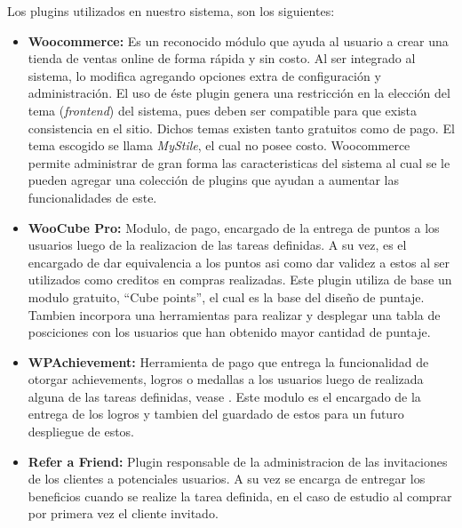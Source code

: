 Los plugins utilizados en nuestro sistema, son los siguientes:

\begin{itemize}

    \item {\bf Woocommerce:}
        Es un reconocido módulo que ayuda al usuario a crear una tienda de
        ventas online de forma rápida y sin costo.
        Al ser integrado al sistema, lo modifica agregando opciones
        extra de configuración y administración.
        El uso de éste plugin genera una restricción en la elección
        del tema (\emph{frontend}) del sistema, pues deben ser compatible
        para que exista consistencia en el sitio.
        Dichos temas existen tanto gratuitos como de pago.
        El tema escogido se llama \emph{MyStile}, el cual no posee costo.
        Woocommerce permite administrar de gran forma las caracteristicas del
        sistema al cual se le pueden agregar una colección de plugins que ayudan a 
	aumentar las funcionalidades de este.

    \item {\bf WooCube Pro:}
	Modulo, de pago, encargado de la entrega de puntos a los usuarios luego de la
	realizacion de las tareas definidas. A su vez, es el encargado de dar equivalencia
	a los puntos asi como dar validez a estos al ser utilizados como creditos 
	en compras realizadas. Este plugin utiliza de base un modulo gratuito, ``Cube points'',
	el cual es la base del diseño de puntaje. Tambien incorpora una herramientas
	para realizar y desplegar una tabla de posciciones con los usuarios que han
	obtenido mayor cantidad de puntaje. 
    \item {\bf WPAchievement:}
	Herramienta de pago que entrega la funcionalidad de otorgar achievements, logros o medallas
	a los usuarios luego de realizada alguna de las tareas definidas, vease .
	Este modulo es el encargado de la entrega de los logros y tambien del guardado de estos 
	para un futuro despliegue de estos.

    \item {\bf Refer a Friend:}
        Plugin responsable de la administracion de las invitaciones de los clientes a
	potenciales usuarios. A su vez se encarga de entregar los beneficios cuando se 
	realize la tarea definida, en el caso de estudio al comprar por primera vez el cliente invitado.

\end{itemize}
